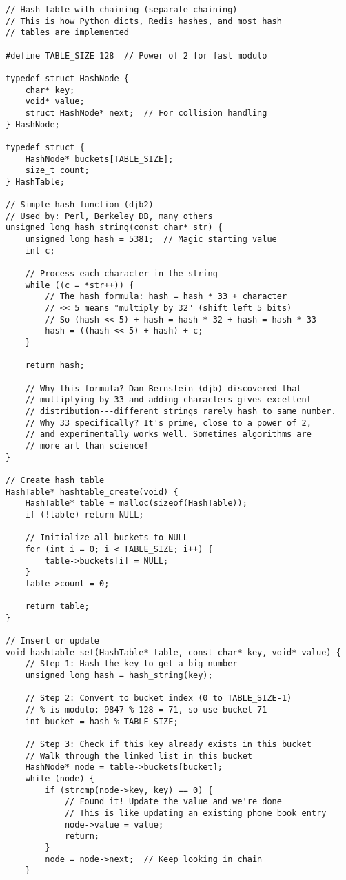 \begin{lstlisting}
// Hash table with chaining (separate chaining)
// This is how Python dicts, Redis hashes, and most hash
// tables are implemented

#define TABLE_SIZE 128  // Power of 2 for fast modulo

typedef struct HashNode {
    char* key;
    void* value;
    struct HashNode* next;  // For collision handling
} HashNode;

typedef struct {
    HashNode* buckets[TABLE_SIZE];
    size_t count;
} HashTable;

// Simple hash function (djb2)
// Used by: Perl, Berkeley DB, many others
unsigned long hash_string(const char* str) {
    unsigned long hash = 5381;  // Magic starting value
    int c;

    // Process each character in the string
    while ((c = *str++)) {
        // The hash formula: hash = hash * 33 + character
        // << 5 means "multiply by 32" (shift left 5 bits)
        // So (hash << 5) + hash = hash * 32 + hash = hash * 33
        hash = ((hash << 5) + hash) + c;
    }

    return hash;

    // Why this formula? Dan Bernstein (djb) discovered that
    // multiplying by 33 and adding characters gives excellent
    // distribution---different strings rarely hash to same number.
    // Why 33 specifically? It's prime, close to a power of 2,
    // and experimentally works well. Sometimes algorithms are
    // more art than science!
}

// Create hash table
HashTable* hashtable_create(void) {
    HashTable* table = malloc(sizeof(HashTable));
    if (!table) return NULL;

    // Initialize all buckets to NULL
    for (int i = 0; i < TABLE_SIZE; i++) {
        table->buckets[i] = NULL;
    }
    table->count = 0;

    return table;
}

// Insert or update
void hashtable_set(HashTable* table, const char* key, void* value) {
    // Step 1: Hash the key to get a big number
    unsigned long hash = hash_string(key);

    // Step 2: Convert to bucket index (0 to TABLE_SIZE-1)
    // % is modulo: 9847 % 128 = 71, so use bucket 71
    int bucket = hash % TABLE_SIZE;

    // Step 3: Check if this key already exists in this bucket
    // Walk through the linked list in this bucket
    HashNode* node = table->buckets[bucket];
    while (node) {
        if (strcmp(node->key, key) == 0) {
            // Found it! Update the value and we're done
            // This is like updating an existing phone book entry
            node->value = value;
            return;
        }
        node = node->next;  // Keep looking in chain
    }


\end{lstlisting}
